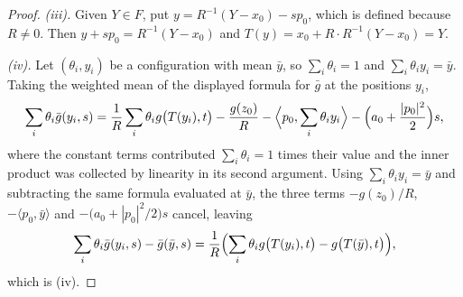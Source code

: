 \begin{proof}
\emph{(iii).} Given $Y\in F$, put $y=R^{-1}(Y-x_0)-sp_0$, which is defined
because $R\ne0$. Then $y+sp_0=R^{-1}(Y-x_0)$ and
$T(y)=x_0+R\cdot R^{-1}(Y-x_0)=Y$.

\emph{(iv).} Let $(\theta_i,y_i)$ be a configuration with mean $\bar y$, so
$\sum_i\theta_i=1$ and $\sum_i\theta_iy_i=\bar y$. Taking the weighted mean of
the displayed formula for $\bar g$ at the positions $y_i$,
\[
  \sum_i\theta_i\bar g(y_i,s)
   =\frac1R\sum_i\theta_ig\bigl(T(y_i),t\bigr)-\frac{g(z_0)}{R}
     -\Bigl\langle p_0,\sum_i\theta_iy_i\Bigr\rangle
     -\Bigl(a_0+\frac{|p_0|^2}{2}\Bigr)s ,
\]
where the constant terms contributed $\sum_i\theta_i=1$ times their value and
the inner product was collected by linearity in its second argument. Using
$\sum_i\theta_iy_i=\bar y$ and subtracting the same formula evaluated at
$\bar y$, the three terms $-g(z_0)/R$, $-\langle p_0,\bar y\rangle$ and
$-\bigl(a_0+|p_0|^2/2\bigr)s$ cancel, leaving
\[
  \sum_i\theta_i\bar g(y_i,s)-\bar g(\bar y,s)
   =\frac1R\Bigl(\sum_i\theta_ig\bigl(T(y_i),t\bigr)-g\bigl(T(\bar y),t\bigr)\Bigr),
\]
which is (iv). \end{proof}
